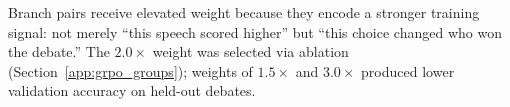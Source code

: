 Branch pairs receive elevated weight because they encode a stronger training
signal: not merely ``this speech scored higher'' but ``this choice changed
who won the debate.'' The $2.0\times$ weight was selected via ablation
(Section~\ref{app:grpo_groups}); weights of $1.5\times$ and $3.0\times$
produced lower validation accuracy on held-out debates.

